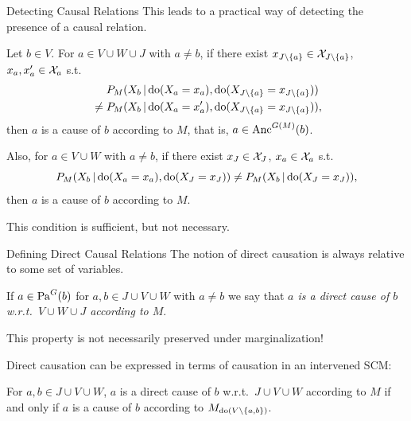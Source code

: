\begin{frame}{Detecting Causal Relations}
This leads to a practical way of detecting the presence of a causal relation.
\begin{Cor}
  Let $b \in V$.
  For $a \in V \cup W \cup J$ with $a \ne b$, if
  there exist $x_{J\setminus\{a\}} \in \mathcal{X}_{J\setminus\{a\}}$, $x_a,x_a' \in \mathcal{X}_a$ s.t.\
      \begin{equation*}\begin{split}
        & P_{M}(X_b \operatorname*{|} \operatorname{do}(X_a=x_a),\operatorname{do}(X_{J\setminus \{a\}}=x_{J\setminus \{a\}})) \\
        {} \ne {} & P_{M}(X_b \operatorname*{|} \operatorname{do}(X_a=x_a'),\operatorname{do}(X_{J\setminus\{a\}}=x_{J\setminus\{a\}})),
      \end{split}\end{equation*}
  then $a$ is a cause of $b$ according to $M$, that is, $a \in \mathrm{Anc}^{G(M)}(b)$.

  Also, for $a \in V \cup W$ with $a \ne b$, if
  there exist $x_J \in \mathcal{X}_J$, $x_a \in \mathcal{X}_a$ s.t.\
  $$P_{M}(X_b \operatorname*{|} \operatorname{do}(X_a=x_a),\operatorname{do}(X_J=x_J)) \ne P_{M}(X_b \operatorname*{|} \operatorname{do}(X_J=x_J)),$$
  then $a$ is a cause of $b$ according to $M$.  
\end{Cor}
This condition is sufficient, but not necessary.
\end{frame}

\begin{frame}{Defining Direct Causal Relations}
The notion of direct causation is always relative to some set of variables.
\begin{Def}
  If $a \in \mathrm{Pa}^G(b)$ for $a, b \in J \cup V \cup W$ with $a\ne b$ we say that \emph{$a$ is a direct cause of $b$ w.r.t.\ $V \cup W \cup J$ according to $M$}.
\end{Def}
This property is not necessarily preserved under marginalization!

\bigskip
Direct causation can be expressed in terms of causation in an intervened SCM:
\begin{Prp}
  For $a,b \in J \cup V \cup W$, $a$ is a direct cause of $b$ w.r.t.\ $J \cup V \cup W$ according to $M$ if and only if $a$ is a cause of $b$ according to $M_{\operatorname{do}(V\setminus\{a,b\})}$.
\end{Prp}
\end{frame}

